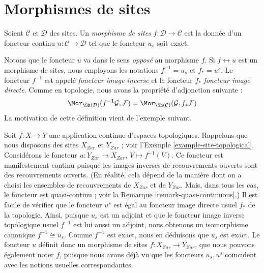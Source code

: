 \section{Morphismes de sites}
\label{section-morphism-sites}

\begin{definition}
\label{definition-morphism-sites}
Soient $\mathcal{C}$ et $\mathcal{D}$ des sites.
Un {\it morphisme de sites} $f : \mathcal{D} \to \mathcal{C}$
est la donnée d’un foncteur continu $u : \mathcal{C} \to \mathcal{D}$
tel que le foncteur $u_s$ soit exact.
\end{definition}

\noindent
Notons que le foncteur $u$ va dans le sens {\it opposé}
au morphisme $f$. Si $f \leftrightarrow u$ est un morphisme de sites,
nous employons les notations $f^{-1} = u_s$ et $f_* = u^s$.
Le foncteur $f^{-1}$ est appelé {\it foncteur image inverse} et
le foncteur $f_*$ {\it foncteur image directe}.
Comme en topologie, nous avons la propriété d’adjonction suivante :
$$
\Mor_{\Sh(\mathcal{D})}(f^{-1}\mathcal{G}, \mathcal{F})
=
\Mor_{\Sh(\mathcal{C})}(\mathcal{G}, f_*\mathcal{F})
$$
La motivation de cette définition vient de l’exemple suivant.

\begin{example}
\label{example-continuous-map}
Soit $f : X  \to Y$ une application continue d’espaces topologiques.
Rappelons que nous disposons des sites $X_{Zar}$ et $Y_{Zar}$ ;
voir l’Exemple \ref{example-site-topological}. Considérons le foncteur
$u : Y_{Zar} \to X_{Zar}$, $V \mapsto f^{-1}(V)$.
Ce foncteur est manifestement continu puisque les images inverses de
recouvrements ouverts sont des recouvrements ouverts. (En réalité, cela dépend de la
manière dont on a choisi les ensembles de recouvrements de $X_{Zar}$ et de $Y_{Zar}$.
Mais, dans tous les cas, le foncteur est quasi-continu ; voir la Remarque
\ref{remark-quasi-continuous}.)
Il est facile de vérifier que le foncteur $u^s$ est égal au foncteur image directe
usuel $f_*$ de la topologie. Ainsi, puisque $u_s$ est un adjoint et que
le foncteur image inverse topologique usuel $f^{-1}$ est lui aussi un adjoint,
nous obtenons un isomorphisme canonique $f^{-1} \cong u_s$. Comme $f^{-1}$
est exact, nous en déduisons que $u_s$ est exact. Le foncteur $u$ définit donc
un morphisme de sites $f : X_{Zar} \to Y_{Zar}$, que nous pouvons également noter
$f$, puisque nous avons déjà vu que les foncteurs $u_s, u^s$ coïncident
avec les notions usuelles correspondantes.
\end{example}


